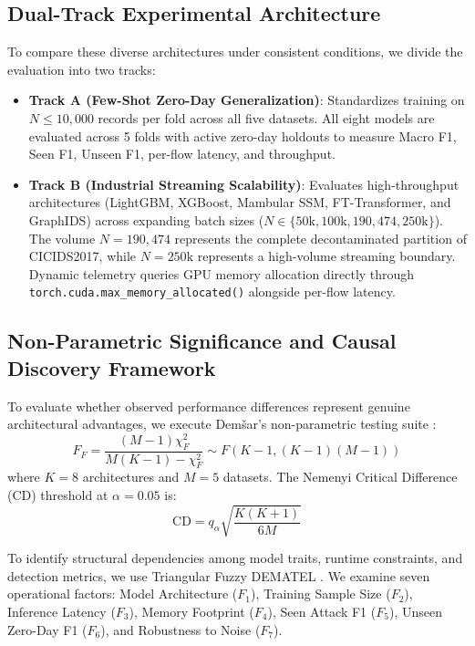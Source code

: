 \documentclass[10pt,a4paper]{article}
\begin{document}
\subsection{Dual-Track Experimental Architecture}
To compare these diverse architectures under consistent conditions, we divide the evaluation into two tracks:
\begin{itemize}
    \item \textbf{Track A (Few-Shot Zero-Day Generalization)}: Standardizes training on $N \le 10,000$ records per fold across all five datasets. All eight models are evaluated across 5 folds with active zero-day holdouts to measure Macro F1, Seen F1, Unseen F1, per-flow latency, and throughput.
    \item \textbf{Track B (Industrial Streaming Scalability)}: Evaluates high-throughput architectures (LightGBM, XGBoost, Mambular SSM, FT-Transformer, and GraphIDS) across expanding batch sizes ($N \in \{50\text{k}, 100\text{k}, 190,474, 250\text{k}\}$). The volume $N = 190,474$ represents the complete decontaminated partition of CICIDS2017, while $N = 250\text{k}$ represents a high-volume streaming boundary. Dynamic telemetry queries GPU memory allocation directly through \texttt{torch.cuda.max\_memory\_allocated()} alongside per-flow latency.
\end{itemize}

\subsection{Non-Parametric Significance and Causal Discovery Framework}
To evaluate whether observed performance differences represent genuine architectural advantages, we execute Dem\v{s}ar's non-parametric testing suite \cite{demsar2006statistical}:
\begin{equation}
F_F = \frac{(M - 1)\chi_F^2}{M(K - 1) - \chi_F^2} \sim F(K - 1, (K - 1)(M - 1))
\end{equation}
where $K = 8$ architectures and $M = 5$ datasets. The Nemenyi Critical Difference (CD) threshold at $\alpha = 0.05$ is:
\begin{equation}
\text{CD} = q_\alpha \sqrt{\frac{K(K + 1)}{6M}}
\end{equation}

To identify structural dependencies among model traits, runtime constraints, and detection metrics, we use Triangular Fuzzy DEMATEL \cite{gabus1973world, zadeh1965fuzzy, tavana2023fuzzydematel, chekry2024pydematel, valdecy2023pydecision}. We examine seven operational factors: Model Architecture ($F_1$), Training Sample Size ($F_2$), Inference Latency ($F_3$), Memory Footprint ($F_4$), Seen Attack F1 ($F_5$), Unseen Zero-Day F1 ($F_6$), and Robustness to Noise ($F_7$). 
\end{document}
